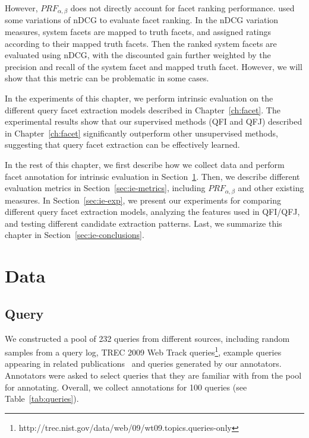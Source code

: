 However, $PRF_{\alpha,\beta}$ does not directly account for facet ranking performance. \citet{dou2011finding} used some variations of nDCG to evaluate facet ranking. In the nDCG variation measures, system facets are mapped to truth facets, and assigned ratings according to their mapped truth facets. Then the ranked system facets are evaluated using nDCG, with the discounted gain further weighted by the precision and recall of the system facet and mapped truth facet. However, we will show that this metric can be problematic in some cases.

In the experiments of this chapter, we perform intrinsic evaluation on the different query facet extraction models described in Chapter~\ref{ch:facet}. The experimental results show that our supervised methods (QFI and QFJ) described in Chapter~\ref{ch:facet} significantly outperform other unsupervised methods, suggesting that query facet extraction can be effectively learned.

In the rest of this chapter, we first describe how we collect data and perform facet annotation for intrinsic evaluation in Section~\ref{sec:ie-data}. Then, we describe different evaluation metrics in Section~\ref{sec:ie-metrics}, including $PRF_{\alpha,\beta}$ and other existing measures. In Section~\ref{sec:ie-exp}, we present our experiments for comparing different query facet extraction models, analyzing the features used in QFI/QFJ, and testing different candidate extraction patterns. Last, we summarize this chapter in Section~\ref{sec:ie-conclusions}. 


\section{Data} \label{sec:ie-data}
\subsection{Query}
We constructed a pool of 232 queries from different sources, including random samples from a query log, TREC 2009 Web Track queries\footnote{http://trec.nist.gov/data/web/09/wt09.topics.queries-only}, example queries appearing in related publications~\cite{xue2011topic,wang2009mining} and queries generated by our annotators.
Annotators were asked to select queries that they are familiar with from the pool for annotating.
Overall, we collect annotations for 100 queries (see Table~\ref{tab:queries}).

